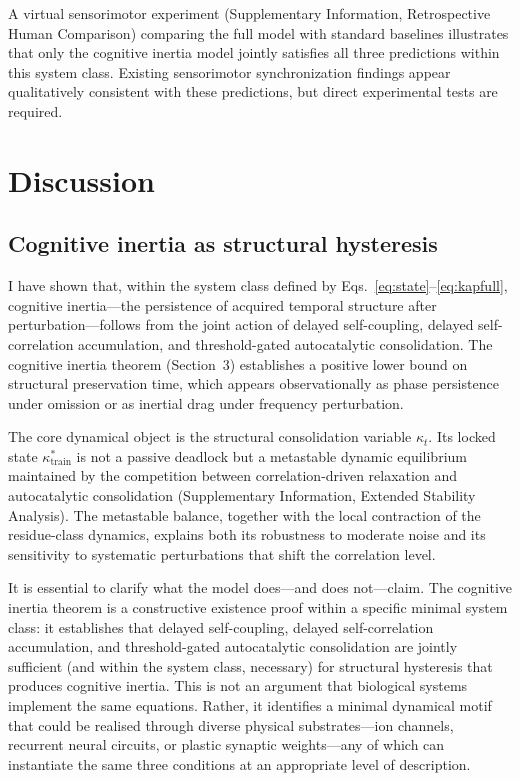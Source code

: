A virtual sensorimotor experiment (Supplementary Information, Retrospective Human Comparison) comparing the full model with standard baselines illustrates that only the cognitive inertia model jointly satisfies all three predictions within this system class. Existing sensorimotor synchronization findings appear qualitatively consistent with these predictions, but direct experimental tests are required.

\section{Discussion}

\subsection{Cognitive inertia as structural hysteresis}

I have shown that, within the system class defined by Eqs.~\eqref{eq:state}--\eqref{eq:kapfull}, cognitive inertia---the persistence of acquired temporal structure after perturbation---follows from the joint action of delayed self-coupling, delayed self-correlation accumulation, and threshold-gated autocatalytic consolidation. The cognitive inertia theorem (Section~3) establishes a positive lower bound on structural preservation time, which appears observationally as phase persistence under omission or as inertial drag under frequency perturbation.

The core dynamical object is the structural consolidation variable $\kappa_t$. Its locked state $\kappa^*_{\mathrm{train}}$ is not a passive deadlock but a metastable dynamic equilibrium maintained by the competition between correlation-driven relaxation and autocatalytic consolidation (Supplementary Information, Extended Stability Analysis). The metastable balance, together with the local contraction of the residue-class dynamics, explains both its robustness to moderate noise and its sensitivity to systematic perturbations that shift the correlation level.

It is essential to clarify what the model does---and does not---claim. The cognitive inertia theorem is a constructive existence proof within a specific minimal system class: it establishes that delayed self-coupling, delayed self-correlation accumulation, and threshold-gated autocatalytic consolidation are jointly sufficient (and within the system class, necessary) for structural hysteresis that produces cognitive inertia. This is not an argument that biological systems implement the same equations. Rather, it identifies a minimal dynamical motif that could be realised through diverse physical substrates---ion channels, recurrent neural circuits, or plastic synaptic weights---any of which can instantiate the same three conditions at an appropriate level of description.

